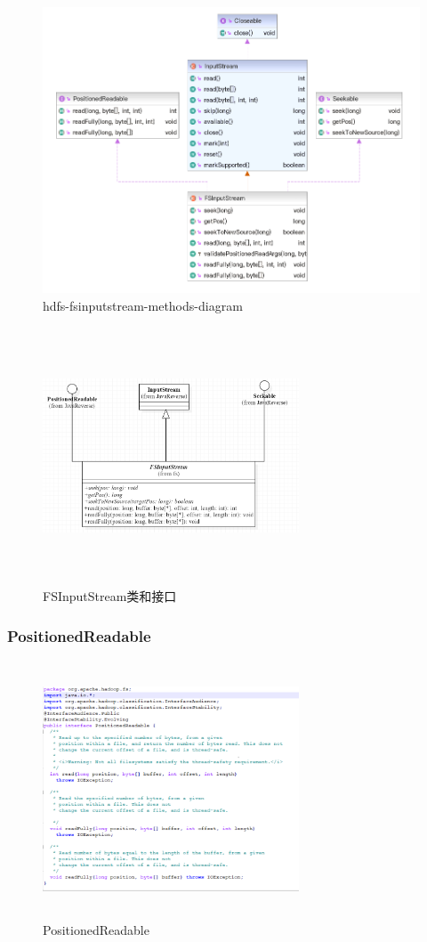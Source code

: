 	\begin{figure}
		\centering
		\includegraphics[width=0.7\linewidth]{UML/inputstream/hdfs-fsinputstream-methods-diagram.png}
		\caption{hdfs-fsinputstream-methods-diagram}
		\label{fig:graph3}
	\end{figure}
	\begin{figure}
		\centering
		\includegraphics[width=3in,height=3in]{UML/inputstream/UML.png}
		\caption{FSInputStream类和接口}
		\label{fig:graph4}
	\end{figure}
	
	\subsubsection{PositionedReadable}
	\begin{figure}
		\centering
		\includegraphics[width=3in,height=3in]{UML/inputstream/PositionedReadable.png}
		\caption{PositionedReadable}
		\label{fig:graph5}
	\end{figure}
	
